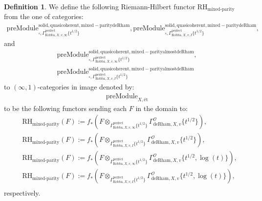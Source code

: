 \documentclass[12pt]{book}
\theoremstyle{definition}
\newtheorem{definition}{Definition}
\begin{document}
\begin{definition}
We define the following Riemann-Hilbert functor $\text{RH}_\text{mixed-parity}$ from the one of categories:
\begin{align}
\mathrm{preModule}^\mathrm{solid,quasicoherent,mixed-paritydeRham}_{\square,\Gamma^\mathrm{perfect}_{\text{Robba},X,v,\infty}\{t^{1/2}\}},
\mathrm{preModule}^\mathrm{solid,quasicoherent,mixed-paritydeRham}_{\square,\Gamma^\mathrm{perfect}_{\text{Robba},X,v,I}\{t^{1/2}\}}, 
\end{align}
and
\begin{align}
\mathrm{preModule}^\mathrm{solid,quasicoherent,mixed-parityalmostdeRham}_{\square,\Gamma^\mathrm{perfect}_{\text{Robba},X,v,\infty}\{t^{1/2}\}},\\
\mathrm{preModule}^\mathrm{solid,quasicoherent,mixed-parityalmostdeRham}_{\square,\Gamma^\mathrm{perfect}_{\text{Robba},X,v,I}\{t^{1/2}\}} 
\end{align}
to $(\infty,1)$-categories in image denoted by:
\begin{align}
\mathrm{preModule}_{X,\text{\'et}}
\end{align}
to be the following functors sending each $F$ in the domain to:
\begin{align}
&\text{RH}_\text{mixed-parity}(F):=f_*(F\otimes_{\Gamma^\mathrm{perfect}_{\text{Robba},X,v,\infty}\{t^{1/2}\}} \Gamma^\mathcal{O}_{\text{deRham},X,v}\{t^{1/2}\}),\\
&\text{RH}_\text{mixed-parity}(F):=f_*(F\otimes_{\Gamma^\mathrm{perfect}_{\text{Robba},X,v,I}\{t^{1/2}\}} \Gamma^\mathcal{O}_{\text{deRham},X,v}\{t^{1/2}\}),\\
&\text{RH}_\text{mixed-parity}(F):=f_*(F\otimes_{\Gamma^\mathrm{perfect}_{\text{Robba},X,v,\infty}\{t^{1/2}\}} \Gamma^\mathcal{O}_{\text{deRham},X,v}\{t^{1/2},\log(t)\}),\\
&\text{RH}_\text{mixed-parity}(F):=f_*(F\otimes_{\Gamma^\mathrm{perfect}_{\text{Robba},X,v,I}\{t^{1/2}\}} \Gamma^\mathcal{O}_{\text{deRham},X,v}\{t^{1/2},\log(t)\}),\\
\end{align}
respectively.

\end{definition}
\end{document}
